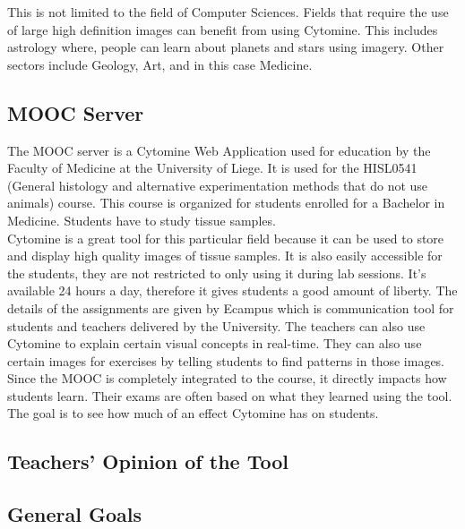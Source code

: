 \documentclass[a4paper,11pt]{report}
\numberwithin{figure}{section} %
\begin{document}
This is not limited to the field of Computer Sciences.
Fields that require the use of large high definition images can benefit from using Cytomine.
This includes astrology where, people can learn about planets and stars using imagery.
Other sectors include Geology, Art, and in this case Medicine.


\subsection{MOOC Server}

The MOOC server is a Cytomine Web Application used for education by the Faculty of Medicine at the University of Liege.
It is used for the HISL0541 (General histology and alternative experimentation methods that do not use animals) course.
This course is organized for students enrolled for a Bachelor in Medicine.
Students have to study tissue samples. \\

Cytomine is a great tool for this particular field because it can be used to store and display high quality images of tissue samples.
It is also easily accessible for the students, they are not restricted to only using it during lab sessions.
It's available 24 hours a day, therefore it gives students a good amount of liberty.
The details of the assignments are given by Ecampus which is communication tool for students and teachers delivered by the University.
The teachers can also use Cytomine to explain certain visual concepts in real-time.
They can also use certain images for exercises by telling students to find patterns in those images.\\

Since the MOOC is completely integrated to the course, it directly impacts how students learn.
Their exams are often based on what they learned using the tool.
The goal is to see how much of an effect Cytomine has on students.

\subsection{Teachers' Opinion of the Tool}
\subsection{General Goals}
\end{document}
